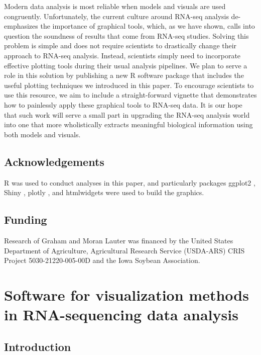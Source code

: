 \documentclass[11pt,a4paper,oldfontcommands,openany]{memoir}
\numberwithin{equation}{section} %
\begin{document}
Modern data analysis is most reliable when models and visuals are used congruently. Unfortunately, the current culture around RNA-seq analysis de-emphasizes the importance of graphical tools, which, as we have shown, calls into question the soundness of results that come from RNA-seq studies. Solving this problem is simple and does not require scientists to drastically change their approach to RNA-seq analysis. Instead, scientists simply need to incorporate effective plotting tools during their usual analysis pipelines. We plan to serve a role in this solution by publishing a new \textsf{R} software package that includes the useful plotting techniques we introduced in this paper. To encourage scientists to use this resource, we aim to include a straight-forward vignette that demonstrates how to painlessly apply these graphical tools to RNA-seq data. It is our hope that such work will serve a small part in upgrading the RNA-seq analysis world into one that more wholistically extracts meaningful biological information using both models and visuals.

\section*{Acknowledgements}

R \citep{R} was used to conduct analyses in this paper, and particularly packages ggplot2 \citep{ggplot2}, Shiny \citep{shiny}, plotly \citep{plotly}, and htmlwidgets were used to build the graphics. 

\section*{Funding}

Research of Graham and Moran Lauter was financed by the United States Department of Agriculture, Agricultural Research Service (USDA-ARS) CRIS Project 5030-21220-005-00D and the Iowa Soybean Association.


\chapter{Software for visualization methods in RNA-sequencing data analysis}
\label{sec:chapter3}

\section{Introduction}
\end{document}
